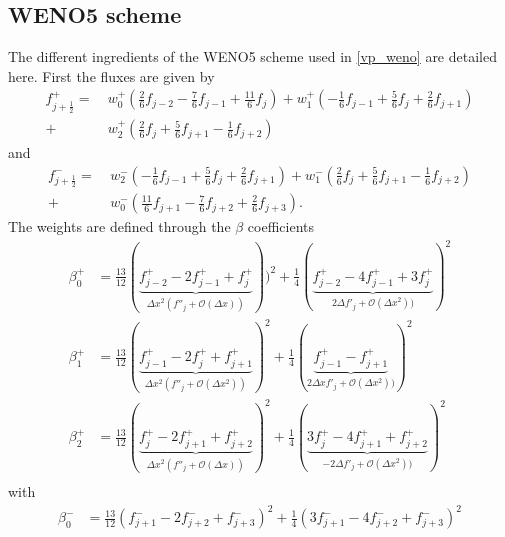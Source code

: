 \begin{subappendices}
\section{WENO5 scheme}
\label{app_weno}
The different ingredients of the WENO5 scheme used in \eqref{vp_weno} are detailed here. First the fluxes are given by
$$
  \begin{aligned}
    {f}_{j+\frac{1}{2}}^+   =\ & w_0^+\left(  \frac{2}{6}f_{j-2} - \frac{7}{6}f_{j-1} + \frac{11}{6}f_{j}   \right)
                                +    w_1^+\left( -\frac{1}{6}f_{j-1} + \frac{5}{6}f_{j}   +  \frac{2}{6}f_{j+1} \right) \\
                                +  & w_2^+\left(  \frac{2}{6}f_{j}   + \frac{5}{6}f_{j+1} -  \frac{1}{6}f_{j+2} \right)
  \end{aligned}
$$
and
$$
  \begin{aligned}
    {f}_{j+\frac{1}{2}}^-   =\ & w_2^-\left( -\frac{1}{6}f_{j-1} + \frac{5}{6}f_{j}   + \frac{2}{6}f_{j+1} \right)
                                +    w_1^-\left(  \frac{2}{6}f_{j}   + \frac{5}{6}f_{j+1} - \frac{1}{6}f_{j+2} \right) \\
                                +  & w_0^-\left( \frac{11}{6}f_{j+1} - \frac{7}{6}f_{j+2} + \frac{2}{6}f_{j+3} \right).
  \end{aligned}
$$
The weights are defined through the $\beta$ coefficients
$$
  \begin{aligned}
    \beta_0^+ &= \frac{13}{12}(\underbrace{f^+_{j-2} - 2f^+_{j-1} + f^+_{j}  }_{\Delta x^2(f''_j + \mathcal{O}(\Delta x))}))^2 + \frac{1}{4}( \underbrace{f^+_{j-2} - 4f^+_{j-1} + 3f^+_{j}}_{2\Delta  f'_j + \mathcal{O}(\Delta x^2))}  )^2 \\
    \beta_1^+ &= \frac{13}{12}( \underbrace{f^+_{j-1} - 2f^+_{j}   + f^+_{j+1}}_{\Delta x^2(f''_j + \mathcal{O}(\Delta x^2))} )^2 + \frac{1}{4}( \underbrace{f^+_{j-1} -  f^+_{j+1}}_{2\Delta x f'_j + \mathcal{O}(\Delta x^2))})^2 \\
    \beta_2^+ &= \frac{13}{12}( \underbrace{f^+_{j}   - 2f^+_{j+1} + f^+_{j+2}}_{\Delta x^2(f''_j + \mathcal{O}(\Delta x))} )^2 + \frac{1}{4}(\underbrace{3f^+_{j}   - 4f^+_{j+1} +  f^+_{j+2}}_{-2\Delta  f'_j + \mathcal{O}(\Delta x^2))})^2 \\
  \end{aligned}
$$
with
$$
  \begin{aligned}
    \beta_0^- &= \frac{13}{12}(f^-_{j+1} - 2f^-_{j+2} + f^-_{j+3})^2 + \frac{1}{4}(3f^-_{j+1} - 4f^-_{j+2} +  f^-_{j+3})^2 \\

\end{aligned}$$
\end{subappendices}
